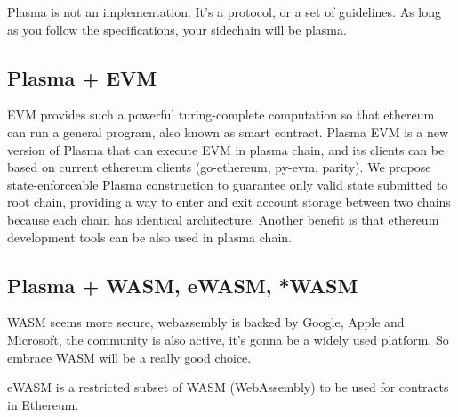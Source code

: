 Plasma is not an implementation. It’s a protocol, or a set of guidelines. As long as you follow the specifications, your sidechain will be plasma.

\subsection{Plasma + EVM}

EVM provides such a powerful turing-complete computation so that ethereum can run a general program, also known as smart contract. Plasma EVM is a new version of Plasma that can execute EVM in plasma chain, and its clients can be based on current ethereum clients (go-ethereum, py-evm, parity). We propose state-enforceable Plasma construction to guarantee only valid state submitted to root chain, providing a way to enter and exit account storage between two chains because each chain has identical architecture. Another benefit is that ethereum development tools can be also used in plasma chain.

\subsection{Plasma + WASM, eWASM, *WASM}

WASM seems more secure, webassembly is backed by Google, Apple and Microsoft, the community is also active, it's gonna be a widely used platform. 
So embrace WASM will be a really good choice.

eWASM is a restricted subset of WASM (WebAssembly) to be used for contracts in Ethereum.